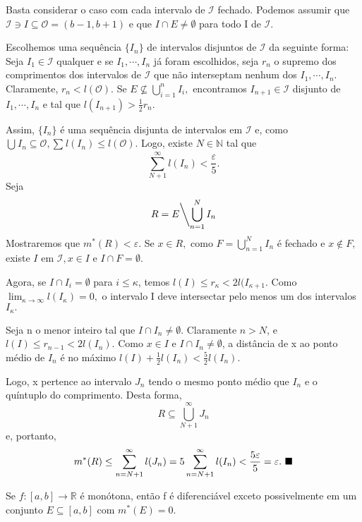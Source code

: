 \documentclass[Analysis/analysis_notes.tex]{subfiles}
\begin{document}
\begin{proof*}
	Basta considerar o caso com cada intervalo de \(\mathcal{I}\) fechado. Podemos assumir que
	\(\mathcal{I}\ni I \subseteq{\mathcal{O}=(b-1, b+1)}\) e que \(I\cap E \neq\emptyset\) para todo I
	de \(\mathcal{I}\).

	Escolhemos uma sequência \(\{I_{n}\}\) de intervalos disjuntos de \(\mathcal{I}\) da
	seguinte forma: Seja \(I_{1}\in \mathcal{I}\) qualquer e se \(I_{1}, \cdots, I_{n}\) já foram
	escolhidos, seja \(r_{n}\) o supremo dos comprimentos dos intervalos de \(\mathcal{I}\) que não interseptam
	nenhum dos \(I_{1}, \cdots, I_{n}\). Claramente, \(r_{n} <  l(\mathcal{O}).\) Se
	\(E\not\subseteq{\bigcup_{i=1}^{n}{I_{i}}},\) encontramos \(I_{n+1}\in \mathcal{I}\)
	disjunto de \(I_{1}, \cdots, I_{n}\) e tal que \(l(I_{n+1}) > \frac{1}{2}r_{n}\).

	Assim, \(\{I_{n}\}\) é uma sequência disjunta de intervalos em \(\mathcal{I}\) e, como
	\(\bigcup_{}^{}{I_{n}\subseteq{\mathcal{O}}}, \sum\limits_{}^{}l(I_{n})\leq l(\mathcal{O}).\) Logo,
	existe \(N\in \mathbb{N}\) tal que
	\[
		\sum\limits_{N+1}^{\infty} l(I_{n}) < \frac{\varepsilon }{5}.
	\]
	Seja
	\[
		R = E\biggl\backslash\bigcup_{n=1}^{N}{I_{n}}\biggr.
	\]
	Mostraremos que \(m^{*}(R) < \varepsilon .\) Se \(x\in R,\) como \(F = \bigcup_{n=1}^{N}{I_{n}}\) é
	fechado e \(x\not\in F,\) existe \(I\) em \(\mathcal{I}, x\in I\) e \(I\cap F=\emptyset.\)

	Agora, se \(I\cap I_{i} = \emptyset\) para \(i\leq \kappa \), temos \(l(I)\leq r_{\kappa } < 2l(I_{\kappa +1}.\)
	Como \(\lim_{\kappa \to \infty}l(I_{\kappa }) = 0,\) o intervalo I deve intersectar
	pelo menos um dos intervalos \(I_{\kappa }.\)

	Seja n o menor inteiro tal que \(I\cap I_{n} \neq\emptyset\). Claramente \(n > N\), e
	\(l(I)\leq r_{n-1} < 2l(I_{n}).\) Como \(x\in I\) e \(I\cap I_{n} \neq\emptyset\), a distância de
	x ao ponto médio de \(I_{n}\) é no máximo \(l(I) + \frac{1}{2}l(I_{n}) < \frac{5}{2} l(I_{n}).\)

	Logo, x pertence ao intervalo \(J_{n}\) tendo o mesmo ponto médio que \(I_{n}\) e
	o quíntuplo do comprimento. Desta forma,
	\[
		R\subseteq{\bigcup_{N+1}^{\infty}{J_{n}}}
	\]
	e, portanto,
	\[
		m^{*}(R)\leq \sum\limits_{n=N+1}^{\infty}l(J_{n}) = 5\sum\limits_{n=N+1}^{\infty}l(I_{n}) < \frac{5\varepsilon }{5} = \varepsilon .\text{ $\blacksquare$}
	\]
\end{proof*}
\begin{lemma*}
	Se \(f:[a, b]\rightarrow \mathbb{R}\) é monótona, então f é diferenciável exceto
	possivelmente em um conjunto \(E\subseteq{[a, b]}\) com \(m^{*}(E) = 0\).
\end{lemma*}
\end{document}
